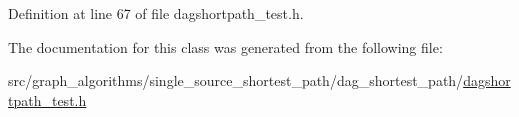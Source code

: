 Definition at line 67 of file dagshortpath\+\_\+test.\+h.



The documentation for this class was generated from the following file\+:\begin{DoxyCompactItemize}
\item 
src/graph\+\_\+algorithms/single\+\_\+source\+\_\+shortest\+\_\+path/dag\+\_\+shortest\+\_\+path/\hyperlink{dagshortpath__test_8h}{dagshortpath\+\_\+test.\+h}\end{DoxyCompactItemize}
